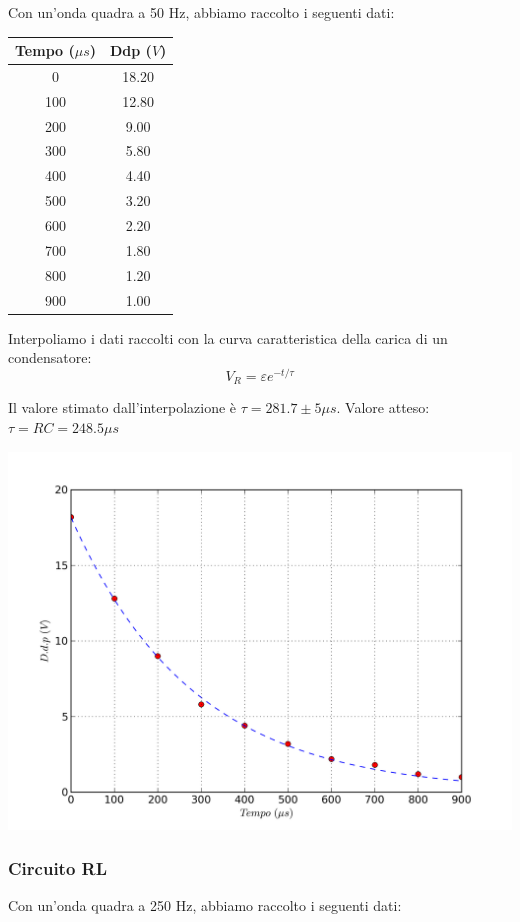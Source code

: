 Con un'onda quadra a 50 Hz, abbiamo raccolto i seguenti dati:
\begin{center}
\begin{tabular}{*{2}{c}}
Tempo ($\mu s$) & Ddp ($V$) \\
\midrule
0 & 18.20 \\
100 & 12.80 \\
200 & 9.00 \\
300 & 5.80 \\
400 & 4.40 \\
500 & 3.20 \\
600 & 2.20 \\
700 & 1.80 \\
800 & 1.20 \\
900 & 1.00 \\
\end{tabular}
\end{center}

Interpoliamo i dati raccolti con la curva caratteristica della carica di un condensatore: 
$$V_R = \varepsilon e^{-t/\tau}$$

Il valore stimato dall'interpolazione è $\tau=281.7 \pm 5 \mu s$.
Valore atteso: $\tau=RC=248.5 \mu s$


\begin{center}
 \includegraphics[scale=0.70]{grafici/C3/fitcond.png}
\end{center}




\subsubsection{Circuito RL}
Con un'onda quadra a 250 Hz, abbiamo raccolto i seguenti dati:

